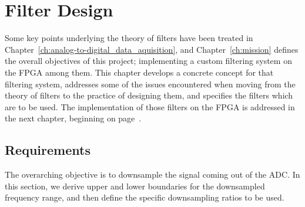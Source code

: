 %
%
\chapter{Filter Design} %
\label{ch:filter_design}
%
%

Some    key    points    underlying     the    theory    of    filters    have
been   treated   in  Chapter~\ref{ch:analog-to-digital_data_aquisition},   and
Chapter~\ref{ch:mission}  defines  the  overall objectives  of  this  project;
implementing a custom  filtering system on the FPGA among  them.  This chapter
develops a concrete  concept for that filtering system, addresses  some of the
issues encountered when  moving from the theory of filters  to the practice of
designing  them,  and  specifies  the  filters which  are  to  be  used.   The
implementation of those filters on the  FPGA is addressed in the next chapter,
beginning on page~\pageref{ch:fpga}.


%
%
\section{Requirements} %
\label{sec:requirements}

The overarching objective  is to downsample the signal coming  out of the ADC.
In this  section, we  derive upper  and lower  boundaries for  the downsampled
frequency range, and then define the specific downsampling ratios to be used.

